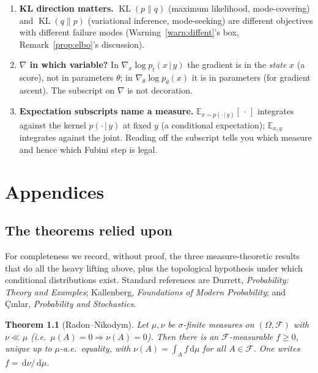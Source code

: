 \documentclass[11pt,oneside]{report}
\theoremstyle{plain}
\newtheorem{theorem}{Theorem}[chapter]
\theoremstyle{definition}
\theoremstyle{remark}
\newcommand{\E}{\mathbb{E}}
\newcommand{\dd}{\,\mathrm{d}}
\newcommand{\Fcal}{\mathcal{F}}
\newcommand{\given}{\,\vert\,}
\DeclareMathOperator{\KL}{KL}
\numberwithin{equation}{chapter}
\begin{document}
\begin{enumerate}[leftmargin=1.6em,itemsep=0.5em]
\item \textbf{KL direction matters.} $\KL(p\|q)$ (maximum likelihood,
mode-covering) and $\KL(q\|p)$ (variational inference, mode-seeking) are
different objectives with different failure modes
(Warning~\ref{warn:diffent}'s box, Remark~\ref{prop:elbo}'s discussion).

\item \textbf{$\nabla$ in which variable?} In $\nabla_x\log p_t(x\given y)$
the gradient is in the \emph{state} $x$ (a score), not in parameters
$\theta$; in $\nabla_\theta\log p_\theta(x)$ it is in parameters (for
gradient ascent). The subscript on $\nabla$ is not decoration.

\item \textbf{Expectation subscripts name a measure.} $\E_{x\sim
p(\cdot\given y)}[\,\cdot\,]$ integrates against the kernel
$p(\cdot\given y)$ at fixed $y$ (a conditional expectation); $\E_{x,y}$
integrates against the joint. Reading off the subscript tells you which
measure and hence which Fubini step is legal.
\end{enumerate}

\appendix
\part*{Appendices}

\chapter{The theorems relied upon}\label{app:theorems}

For completeness we record, without proof, the three measure-theoretic
results that do all the heavy lifting above, plus the topological hypothesis
under which conditional distributions exist. Standard references are
Durrett, \emph{Probability: Theory and Examples}; Kallenberg,
\emph{Foundations of Modern Probability}; and Çınlar, \emph{Probability and
Stochastics}.

\begin{theorem}[Radon--Nikodym]\label{thm:rn}
Let $\mu,\nu$ be $\sigma$-finite measures on $(\Omega,\Fcal)$ with
$\nu\ll\mu$ (i.e.\ $\mu(A)=0\Rightarrow\nu(A)=0$). Then there is an
$\Fcal$-measurable $f\ge0$, unique up to $\mu$-a.e.\ equality, with
$\nu(A)=\int_A f\dd\mu$ for all $A\in\Fcal$. One writes $f=\dd\nu/\dd\mu$.
\end{theorem}
\end{document}
